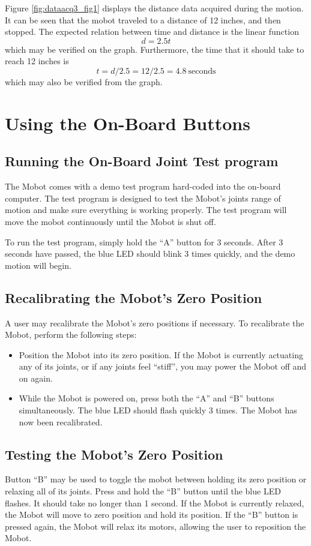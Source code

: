 \documentclass{article}
\begin{document}
Figure \ref{fig:dataacq3_fig1} displays the distance data acquired during the motion. It can
be seen that the mobot traveled to a distance of 12 inches, and then stopped. The
expected relation between time and distance is the linear function 
\begin{equation*}
d = 2.5t
\end{equation*}
which may be verified on the graph. Furthermore, the time that it should take to reach 
12 inches is 
\begin{equation}
t = d / 2.5 = 12 / 2.5 = 4.8 ~\text{seconds}
\end{equation}
which may also be verified from the graph.

\section{Using the On-Board Buttons}
\subsection{Running the On-Board Joint Test program}
The Mobot comes with a demo test program hard-coded into the on-board
computer. The test program is designed to test the Mobot's joints range of 
motion and make sure everything is working properly. The test program will
move the mobot continuously until the Mobot is shut off.

To run the test program, simply hold the ``A'' button for 3 seconds. After
3 seconds have passed, the blue LED should blink 3 times quickly, and the
demo motion will begin.

\subsection{Recalibrating the Mobot's Zero Position}
A user may recalibrate the Mobot's zero positions if necessary. To recalibrate
the Mobot, perform the following steps:
\begin{itemize}
\item Position the Mobot into its zero position. If the Mobot is currently
actuating any of its joints, or if any joints feel ``stiff'', you may power the
Mobot off and on again.
\item While the Mobot is powered on, press both the ``A'' and ``B'' buttons
simultaneously. The blue LED should flash quickly 3 times. The Mobot has now
been recalibrated.
\end{itemize}

\subsection{\label{sec:zeroposition}Testing the Mobot's Zero Position}
Button ``B'' may be used to toggle the mobot between holding its zero position 
or relaxing all of its joints. Press and hold the ``B'' button until the blue
LED flashes. It should take no longer than 1 second. If the Mobot is currently relaxed,
the Mobot will move to zero position and hold its position. If the ``B'' button is pressed again, the 
Mobot will relax its motors, allowing the user to reposition the Mobot.
\end{document}
